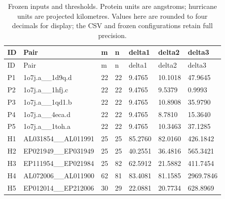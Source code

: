\begingroup
\small
\begin{longtable}{lllllll}
\caption{Frozen inputs and thresholds. Protein units are angstroms; hurricane units are projected kilometres. Values here are rounded to four decimals for display; the CSV and frozen configurations retain full precision.}\label{tab:inputs}\\
\toprule
ID & Pair & m & n & delta1 & delta2 & delta3 \\
\midrule
\endfirsthead
\toprule
ID & Pair & m & n & delta1 & delta2 & delta3 \\
\midrule
\endhead
P1 & 1o7j.a\_\_1d9q.d & 22 & 22 & 9.4765 & 10.1018 & 47.9645 \\
P2 & 1o7j.a\_\_1hfj.c & 22 & 22 & 9.4765 & 9.5379 & 0.9993 \\
P3 & 1o7j.a\_\_1qd1.b & 22 & 22 & 9.4765 & 10.8908 & 35.9790 \\
P4 & 1o7j.a\_\_4eca.d & 22 & 22 & 9.4765 & 8.7810 & 15.3640 \\
P5 & 1o7j.a\_\_1toh.a & 22 & 22 & 9.4765 & 10.3463 & 37.1285 \\
H1 & AL031854\_\_AL011991 & 25 & 25 & 85.2760 & 82.0160 & 426.1842 \\
H2 & EP021949\_\_EP031949 & 25 & 25 & 40.2551 & 36.4816 & 565.3421 \\
H3 & EP111954\_\_EP021984 & 25 & 82 & 62.5912 & 21.5882 & 411.7454 \\
H4 & AL072006\_\_AL011900 & 62 & 81 & 83.4081 & 81.1585 & 2969.7846 \\
H5 & EP012014\_\_EP212006 & 30 & 29 & 22.0881 & 20.7734 & 628.8969 \\
\bottomrule
\end{longtable}
\endgroup
